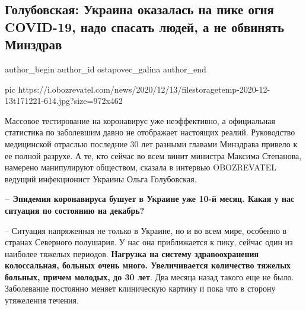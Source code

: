  
 
 
 
 
 
\subsection{Голубовская: Украина оказалась на пике огня COVID-19, надо спасать людей, а не обвинять Минздрав}
\label{sec:13_12_2020.news.ua.obozrevatel.ostapovec_galina.1.covid_pik}
\ifcmt
	author_begin
   author_id ostapovec_galina
	author_end
\fi

\ifcmt
pic https://i.obozrevatel.com/news/2020/12/13/filestoragetemp-2020-12-13t171221-614.jpg?size=972x462
\fi

Массовое тестирование на
коронавирус уже
неэффективно, а официальная статистика по заболевшим давно не отображает
настоящих реалий. Руководство медицинской отраслью последние 30 лет разными
главами Минздрава привело к ее полной разрухе. А те, кто сейчас во всем винит
министра Максима
Степанова,
намерено манипулируют обществом, сказала в интервью OBOZREVATEL ведущий
инфекционист Украины Ольга
Голубовская.

\textbf{– Эпидемия коронавируса бушует в Украине уже 10-й месяц. Какая у нас ситуация
по состоянию на декабрь?}

– Ситуация напряженная не только в Украине, но и во всем мире, особенно в
странах Северного полушария. У нас она приближается к пику, сейчас один из
наиболее тяжелых периодов. \textbf{Нагрузка на систему здравоохранения колоссальная,
больных очень много. Увеличивается количество тяжелых больных, причем молодых,
до 30 лет}. Два месяца назад такого еще не было. Заболевание постоянно меняет
клиническую картину и пока что в сторону утяжеления течения.

